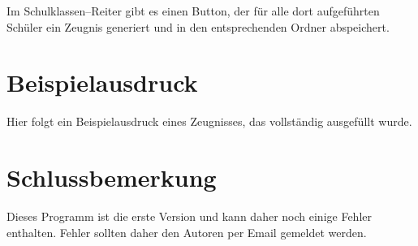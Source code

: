 \documentclass[a4paper,notitlepage,parskip]{scrartcl}
\begin{document}
Im Schulklassen--Reiter gibt es einen Button, der für alle dort aufgeführten Schüler ein Zeugnis generiert und in den entsprechenden Ordner abspeichert.

\section{Beispielausdruck}
Hier folgt ein Beispielausdruck eines Zeugnisses, das vollständig ausgefüllt wurde.



\section{Schlussbemerkung}
Dieses Programm ist die erste Version und kann daher noch einige Fehler enthalten.
Fehler sollten daher den Autoren per Email gemeldet werden.
\end{document}
